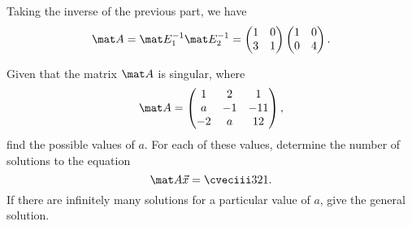 \begin{solution}
\begin{ppart}
    \end{ppart}
    \begin{ppart}
        Taking the inverse of the previous part, we have \[\mat A = \mat E_1^{-1} \mat E_2^{-1} = \begin{pmatrix}1 & 0 \\ 3 & 1\end{pmatrix} \begin{pmatrix}1 & 0 \\ 0 & 4\end{pmatrix}.\]
    \end{ppart}
\end{solution}

\clearpage
\begin{problem}
    Given that the matrix $\mat A$ is singular, where \[\mat A = \begin{pmatrix}1 & 2 & 1 \\ a & -1 & -11 \\ -2 & a & 12\end{pmatrix},\] find the possible values of $a$. For each of these values, determine the number of solutions to the equation \[\mat A \vec x = \cveciii321.\] If there are infinitely many solutions for a particular value of $a$, give the general solution.
\end{problem}
